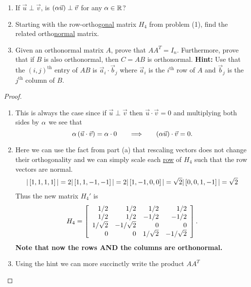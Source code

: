 \documentclass{tutorial}
\begin{document}
\begin{prob} \mbox{}
\begin{enumerate}[label=(\alph*)]
\item If $\vec{u} \perp \vec{v}$, is $\left( \alpha \vec{u} \right) \perp \vec{v}$ for any $\alpha \in \mathbb{R}$? 
\item Starting with the row-ortho\underline{gonal} matrix $H_4$ from problem (1), find the related ortho\underline{normal} matrix.
\item Given an orthonormal matrix $A$, prove that $AA^T = I_n$. Furthermore, prove that if $B$ is also orthonormal, then $C=AB$ is orthonormal. \textbf{Hint:} Use that the $(i,j)^{\text{th}}$ entry of $AB$ is $\vec{a}_i \cdot \vec{b}_j$ where $\vec{a}_i$ is the $i^{\text{th}}$ row of $A$ and $\vec{b}_j$ is the $j^{\text{th}}$ column of $B$.
\end{enumerate}
\end{prob} \ifsolns \begin{proof} \mbox{}
\begin{enumerate}[label=(\alph*)]
\item This is always the case since if $\vec{u} \perp \vec{v}$ then $\vec{u} \cdot \vec{v} = 0$ and multiplying both sides by $\alpha$ we see that
\[
  \alpha \left( \vec{u} \cdot \vec{v} \right) = \alpha \cdot 0
  \hspace{0.25in} \Longrightarrow \hspace{0.25in}
  \left( \alpha \vec{u} \right) \cdot \vec{v} = 0 .
\]
\item Here we can use the fact from part (a) that rescaling vectors does not change their orthogonality and we can simply scale each \underline{row} of $H_4$ such that the row vectors are normal.
\begin{align*}
    | \left[ 1,  1,  1,  1 \right] | = 2
    | \left[ 1,  1, -1, -1 \right] | = 2
    | \left[ 1, -1,  0,  0 \right] | = \sqrt{2}
    | \left[ 0,  0,  1, -1 \right] | = \sqrt{2}
\end{align*}
Thus the new matrix $H_4'$ is
\[
  H_4 = \left[ \begin{array}{rrrr}
     1/2 &  1/2 &  1/2 &  1/2 \\
     1/2 &  1/2 & -1/2 & -1/2 \\
     1/\sqrt{2} & -1/\sqrt{2} &  0 &  0 \\
     0 &  0 &  1/\sqrt{2} & -1/\sqrt{2}
  \end{array} \right] .
\]
\textbf{Note that now the rows AND the columns are orthonormal.}
\item Using the hint we can more succinctly write the product $AA^T$

\end{enumerate}
\end{proof}
\end{document}
